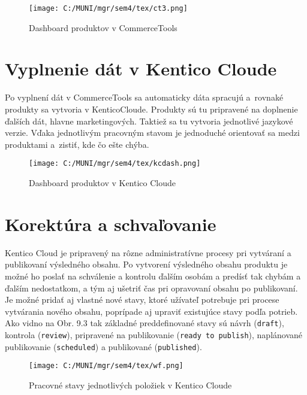 \documentclass[
  printed, %
  table,   %
  lof,     %
  nolot,     %
  twoside,  
]{fithesis3}
\begin{document}
\begin{figure}[h]
  \begin{center}
        \texttt{[image: C:/MUNI/mgr/sem4/tex/ct3.png]}
  \end{center}
  \caption{Dashboard produktov v CommerceTools \cite{ecdash}}
  \label{fig:dashboard CT}
\end{figure}
\section{Vyplnenie dát v Kentico Cloude}
Po vyplnení dát v CommerceTools sa automaticky dáta spracujú a~rovnaké produkty sa vytvoria v KenticoCloude. Produkty sú tu pripravené na doplnenie ďalších dát, hlavne marketingových. Taktiež sa tu vytvoria jednotlivé jazykové verzie. Vďaka jednotlivým pracovným stavom je jednoduché orientovať sa medzi produktami a~zistiť, kde čo ešte chýba.
\begin{figure}[h]
  \begin{center}
        \texttt{[image: C:/MUNI/mgr/sem4/tex/kcdash.png]}
  \end{center}
  \caption{Dashboard produktov v Kentico Cloude \cite{kcdash}}
  \label{fig:dashboard Kentico}
\end{figure}


\section{Korektúra a schvaľovanie}
Kentico Cloud je pripravený na rôzne administratívne procesy pri vytváraní a publikovaní výsledného obsahu. Po vytvorení výsledného obsahu produktu je možné ho poslať na schválenie a kontrolu ďalším osobám a predísť tak chybám a ďalším nedostatkom, a tým aj ušetriť čas pri opravovaní obsahu po publikovaní. Je možné pridať aj vlastné nové stavy, ktoré užívateľ potrebuje pri procese vytvárania nového obsahu, poprípade aj upraviť existujúce stavy podľa potrieb. Ako vidno na Obr. 9.3 tak základné preddefinované stavy sú návrh (\texttt{draft}), kontrola (\texttt{review}), pripravené na publikovanie (\texttt{ready to publish}), naplánované publikovanie (\texttt{scheduled}) a publikované (\texttt{published}).
\begin{figure}[h]
  \begin{center}
        \texttt{[image: C:/MUNI/mgr/sem4/tex/wf.png]}
  \end{center}
  \caption{Pracovné stavy jednotlivých položiek v Kentico Cloude \cite{kcdash}}
  \label{fig:workflow}
\end{figure}
\end{document}
